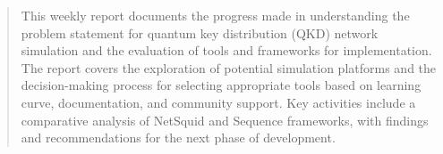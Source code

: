 \titleformat{\section}{\large\bfseries\sffamily\raggedright}{\thesection}{1em}{}
\titleformat{\subsection}{\large\bfseries\sffamily\raggedright}{\thesubsection}{1em}{}
\titleformat{\subsubsection}{\normalsize\bfseries\sffamily\raggedright}{\thesubsubsection}{1em}{}














\begin{abstract}
    \noindent
    This weekly report documents the progress made in understanding the problem statement for quantum key distribution (QKD) network simulation and the evaluation of tools and frameworks for implementation. The report covers the exploration of potential simulation platforms and the decision-making process for selecting appropriate tools based on learning curve, documentation, and community support. Key activities include a comparative analysis of NetSquid \cite{NetSquidTutorial} and Sequence \cite{SequenceTutorial} frameworks, with findings and recommendations for the next phase of development.
\end{abstract}
\newpage

\renewcommand{\baselinestretch}{1}\normalsize
\tableofcontents
\renewcommand{\baselinestretch}{1}\normalsize
\thispagestyle{fancy}
\newpage

